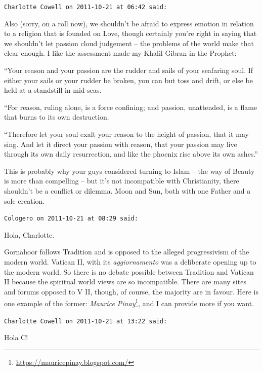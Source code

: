 \begin{footnotesize}
\begin{sffamily}
\hfill

\texttt{Charlotte Cowell on 2011-10-21 at 06:42 said:}

Also (sorry, on a roll now), we shouldn't be afraid to express emotion in relation to a religion that is founded on Love, though certainly you're right in saying that we shouldn't let passion cloud judgement -- the problems of the world make that clear enough. I like the assessment made my Khalil Gibran in the Prophet:

``Your reason and your passion are the rudder and sails of your seafaring soul. If either your sails or your rudder be broken, you can but toss and drift, or else be held at a standstill in mid-seas.

``For reason, ruling alone, is a force confining; and passion, unattended, is a flame that burns to its own destruction.

``Therefore let your soul exalt your reason to the height of passion, that it may sing. And let it direct your passion with reason, that your passion may live through its own daily resurrection, and like the phoenix rise above its own ashes.''

This is probably why your guys considered turning to Islam -- the way of Beauty is more than compelling -- but it's not incompatible with Christianity, there shouldn't be a conflict or dilemma. Moon and Sun, both with one Father and a sole creation.

\hfill

\texttt{Cologero on 2011-10-21 at 08:29 said:}

Hola, Charlotte.

Gornahoor follows Tradition and is opposed to the alleged progressivism of the modern world. Vatican II, with its \emph{aggiornamento} was a deliberate opening up to the modern world. So there is no debate possible between Tradition and Vatican II because the spiritual world views are so incompatible. There are many sites and forums opposed to V II, though, of course, the majority are in favour. Here is one example of the former: \textit{Maurice Pinay}\footnote{\url{https://mauricepinay.blogspot.com/}}, and I can provide more if you want.

\hfill

\texttt{Charlotte Cowell on 2011-10-21 at 13:22 said:}

Hola C!


\end{sffamily}
\end{footnotesize}

